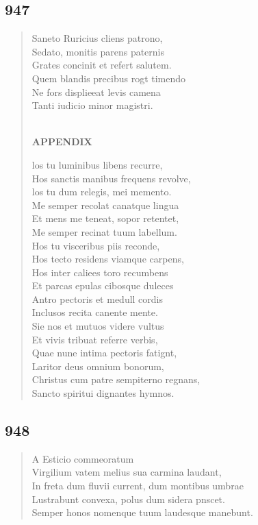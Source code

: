 \documentclass[11pt, a4paper]{report}
\begin{document}
            \subsection*{947}
      \begin{verse}
      Saneto Ruricius cliens patrono, \\ Sedato, monitis parens paternis \\ Grates concinit et refert salutem. \\ Quem blandis precibus rogt timendo \\ Ne fors displieeat levis camena \\ Tanti iudicio minor magistri. \\ 
        ﻿\pagebreak 
    \begin{center} \textbf{APPENDIX} \end{center} \marginpar{[369]} los tu luminibus libens recurre, \\ Hos sanctis manibus frequens revolve, \\ los tu dum relegis, mei memento. \\ Me semper recolat canatque lingua \\ Et mens me teneat, sopor retentet, \\ Me semper recinat tuum labellum. \\ Hos tu visceribus piis reconde, \\ Hos tecto residens viamque carpens, \\ Hos inter caliees toro recumbens \\ Et parcas epulas cibosque duleces \\ Antro pectoris et medull cordis \\ Inclusos recita canente mente. \\ Sie nos et mutuos videre vultus \\ Et vivis tribuat referre verbis, \\ Quae nune intima pectoris fatignt, \\ Laritor deus omnium bonorum, \\ Christus cum patre sempiterno regnans, \\ Sancto spiritui dignantes hymnos. \\ 
      \end{verse}
  
            \subsection*{948}
      \begin{verse}
      A Esticio commeoratum \\ Virgilium vatem melius sua carmina laudant, \\ In freta dum fluvii current, dum montibus umbrae \\ Lustrabunt convexa, polus dum sidera pnscet. \\ Semper honos nomenque tuum laudesque manebunt. \\ 
      \end{verse}
  
\end{document}
